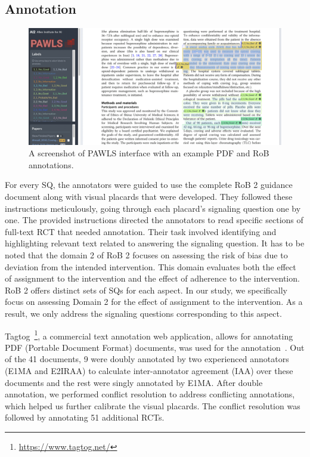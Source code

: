 \documentclass[sn-mathphys,Numbered]{sn-jnl}%
\theoremstyle{thmstyleone}%
\theoremstyle{thmstyletwo}%
\theoremstyle{thmstylethree}%
\begin{document}
\subsection{Annotation}
\label{annotation}
%
%
%
%
\begin{figure}[htb]
    \centering
    \includegraphics[width=0.80\columnwidth]{figures/pawls_layout.png}
    \caption{A screenshot of PAWLS interface with an example PDF and RoB annotations.}
    \label{fig:pawls}
\end{figure}
%
%
%
For every SQ, the annotators were guided to use the complete RoB 2 guidance document along with visual placards that were developed.
They followed these instructions meticulously, going through each placard's signaling question one by one.
The provided instructions directed the annotators to read specific sections of full-text RCT that needed annotation.
Their task involved identifying and highlighting relevant text related to answering the signaling question.
It has to be noted that the domain 2 of RoB 2 focuses on assessing the risk of bias due to deviation from the intended intervention.
This domain evaluates both the effect of assignment to the intervention and the effect of adherence to the intervention.
RoB 2 offers distinct sets of SQs for each aspect.
In our study, we specifically focus on assessing Domain 2 for the effect of assignment to the intervention.
As a result, we only address the signaling questions corresponding to this aspect.


Tagtog~\footnote{\url{https://www.tagtog.net/}}, a commercial text annotation web application, allows for annotating PDF (Portable Document Format) documents, was used for the annotation~\cite{cejuela2014tagtog}.
Out of the 41 documents, 9 were doubly annotated by two experienced annotators (E1MA and E2IRAA) to calculate inter-annotator agreement (IAA) over these documents and the rest were singly annotated by E1MA.
After double annotation, we performed conflict resolution to address conflicting annotations, which helped us further calibrate the visual placards.
The conflict resolution was followed by annotating 51 additional RCTs.
\end{document}
